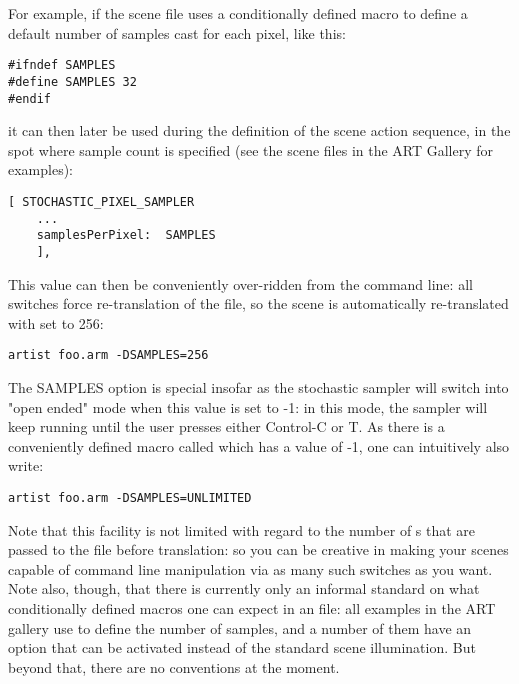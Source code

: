 For example, if the scene file  uses a conditionally defined macro  to define a default number of samples cast for each pixel, like this:

\begin{verbatim}
#ifndef SAMPLES
#define SAMPLES 32
#endif
\end{verbatim}

it can then later be used during the definition of the scene action sequence, in the spot where sample count is specified (see the scene files in the ART Gallery for examples):

\begin{verbatim}
[ STOCHASTIC_PIXEL_SAMPLER
	...
    samplesPerPixel:  SAMPLES
    ],
\end{verbatim}

This value can then be conveniently over-ridden from the command line: all  switches force re-translation of the  file, so the scene is automatically re-translated with  set to 256:

\begin{verbatim}
artist foo.arm -DSAMPLES=256
\end{verbatim}

The SAMPLES option is special insofar as the stochastic sampler will switch into "open ended" mode when this value is set to -1: in this mode, the sampler will keep running until the user presses either Control-C or T. As there is a conveniently defined macro called  which has a value of -1, one can intuitively also write: 

\begin{verbatim}
artist foo.arm -DSAMPLES=UNLIMITED
\end{verbatim}

Note that this facility is not limited with regard to the number of s that are passed to the  file before translation: so you can be creative in making your scenes capable of command line manipulation via as many such switches as you want. Note also, though, that there is currently only an informal standard on what conditionally defined macros one can expect in an  file: all examples in the ART gallery use  to define the number of samples, and a number of them have an option  that can be activated instead of the standard scene illumination. But beyond that, there are no conventions at the moment.

